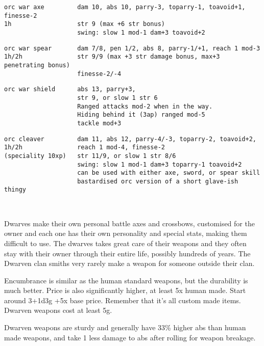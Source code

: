 \small \begin{samepage} \begin{verbatim}
orc war axe         dam 10, abs 10, parry-3, toparry-1, toavoid+1, finesse-2
1h                  str 9 (max +6 str bonus)
                    swing: slow 1 mod-1 dam+3 toavoid+2
\end{verbatim} \blocklistgap \begin{verbatim}
orc war spear       dam 7/8, pen 1/2, abs 8, parry-1/+1, reach 1 mod-3
1h/2h               str 9/9 (max +3 str damage bonus, max+3 penetrating bonus)
                    finesse-2/-4
\end{verbatim} \blocklistgap \begin{verbatim}
orc war shield      abs 13, parry+3,
                    str 9, or slow 1 str 6
                    Ranged attacks mod-2 when in the way.
                    Hiding behind it (3ap) ranged mod-5
                    tackle mod+3
\end{verbatim} \blocklistgap \begin{verbatim}
orc cleaver         dam 11, abs 12, parry-4/-3, toparry-2, toavoid+2, 
1h/2h               reach 1 mod-4, finesse-2
(speciality 10xp)   str 11/9, or slow 1 str 8/6
                    swing: slow 1 mod-1 dam+3 toparry-1 toavoid+2
                    can be used with either axe, sword, or spear skill
                    bastardised orc version of a short glave-ish thingy
\end{verbatim} \end{samepage} \normalsize \goodbreak

\


\goodbreak
\noindent Dwarves make their own personal battle axes and crossbows, customised for the owner and each one has their own personality and special stats, making them difficult to use. The dwarves takes great care of their weapons and they often stay with their owner through their entire life, possibly hundreds of years. The Dwarven clan smiths very rarely make a weapon for someone outside their clan.

Encumbrance is similar as the human standard weapons, but the durability is much better. Price is also significantly higher, at least 5x human made. Start around 3+1d3g +5x base price. Remember that it's all custom made items. Dwarven weapons cost at least 5g.

Dwarven weapons are sturdy and generally have 33\% higher abs than human made weapons, and take 1 less damage to abs after rolling for weapon breakage.

